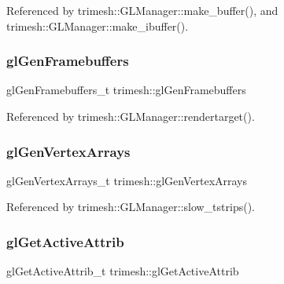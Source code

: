 Referenced by trimesh\+::\+G\+L\+Manager\+::make\+\_\+buffer(), and trimesh\+::\+G\+L\+Manager\+::make\+\_\+ibuffer().

\mbox{\label{namespacetrimesh_a511f32d57e2febad74a3a9ab3e806dbb}} 
\subsubsection{\texorpdfstring{gl\+Gen\+Framebuffers}{glGenFramebuffers}}
{\footnotesize\ttfamily gl\+Gen\+Framebuffers\+\_\+t trimesh\+::gl\+Gen\+Framebuffers\hspace{0.3cm}{\ttfamily [static]}}



Referenced by trimesh\+::\+G\+L\+Manager\+::rendertarget().

\mbox{\label{namespacetrimesh_ac5f6da5e29e97f3bfef9958c64c1ca1e}} 
\subsubsection{\texorpdfstring{gl\+Gen\+Vertex\+Arrays}{glGenVertexArrays}}
{\footnotesize\ttfamily gl\+Gen\+Vertex\+Arrays\+\_\+t trimesh\+::gl\+Gen\+Vertex\+Arrays\hspace{0.3cm}{\ttfamily [static]}}



Referenced by trimesh\+::\+G\+L\+Manager\+::slow\+\_\+tstrips().

\mbox{\label{namespacetrimesh_a1a1349442b26f21511fd3bd9463a2888}} 
\subsubsection{\texorpdfstring{gl\+Get\+Active\+Attrib}{glGetActiveAttrib}}
{\footnotesize\ttfamily gl\+Get\+Active\+Attrib\+\_\+t trimesh\+::gl\+Get\+Active\+Attrib\hspace{0.3cm}{\ttfamily [static]}}



